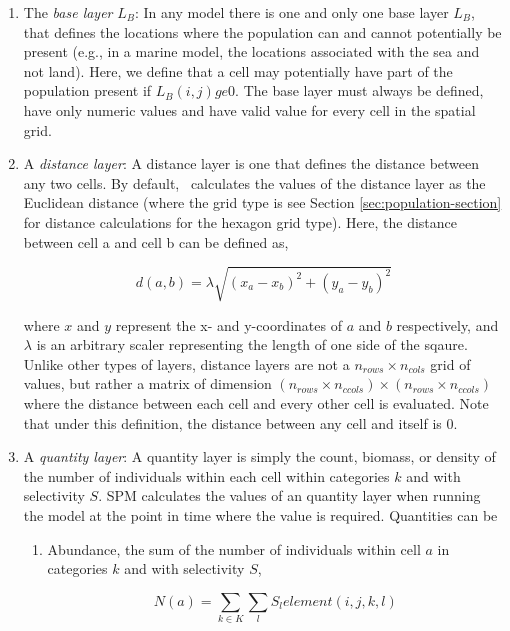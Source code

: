 \begin{enumerate}
\item The \emph{base layer} $L_B$: In any model there is one and only one base layer $L_B$, that defines the locations where the population can and cannot potentially be present (e.g., in a marine model, the locations associated with the sea and not land). Here, we define that a cell may potentially have part of the population present if $L_B(i,j) ge 0$. The base layer must always be defined, have only numeric values and have valid value for every cell in the spatial grid.

\item A \emph{distance layer}: A distance layer is one that defines the distance between any two cells. By default, \SPM\ calculates the values of the distance layer as the Euclidean distance (where the grid type is  \textemdash see Section \ref{sec:population-section} for distance calculations for the hexagon grid type). Here, the distance between cell a and cell b can be defined as,

\[
d\left( {a,b} \right) = \lambda \sqrt {\left( {x_a  - x_b } \right)^2  + \left( {y_a  - y_b } \right)^2 } 
\]

where $x$ and $y$ represent the x- and y-coordinates of $a$ and $b$ respectively, and $\lambda$ is an arbitrary scaler representing the length of one side of the sqaure. Unlike other types of layers, distance layers are not a $n_{rows} \times n_{cols}$ grid of values, but rather a matrix of dimension $(n_{rows} \times n_{ccols}) \times (n_{rows} \times n_{ccols})$  where the distance between each cell and every other cell is evaluated. Note that under this definition, the distance between any cell and itself is 0. 

\item A \emph{quantity layer}: A quantity layer is simply the count, biomass, or density of the number of individuals within each cell within categories $k$ and with selectivity $S$. SPM calculates the values of an quantity layer when running the model at the point in time where the value is required. Quantities can be 

\begin{enumerate}

\item Abundance, the sum of the number of individuals within cell $a$ in categories $k$ and with selectivity $S$,

\[
N\left( a \right) = \sum\limits_{k \in K} {\sum\limits_l {S_l element\left( {i,j,k,l} \right)} } 
\]


\end{enumerate}
\end{enumerate}
